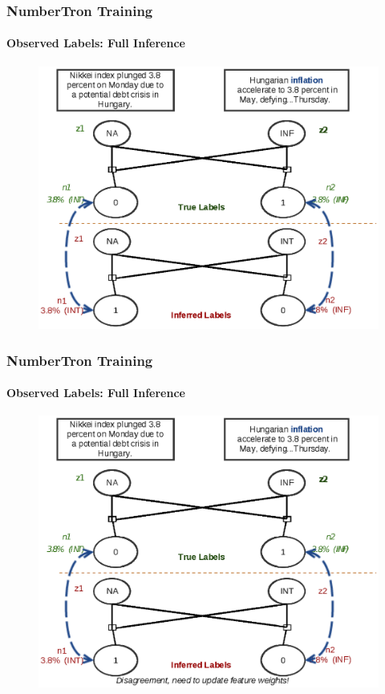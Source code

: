 \documentclass{beamer}
\begin{document}
\begin{frame}
\frametitle{NumberTron Training}
\framesubtitle{Observed Labels: Full Inference}
\begin{figure}
\includegraphics[width=\textwidth, height=0.85\textheight]{images/fullinf_3.eps}
\end{figure}
\end{frame}


\begin{frame}
\frametitle{NumberTron Training}
\framesubtitle{Observed Labels: Full Inference}
\begin{figure}
\includegraphics[width=\textwidth, height=0.85\textheight]{images/fullinf_4.eps}
\end{figure}
\end{frame}
\end{document}
